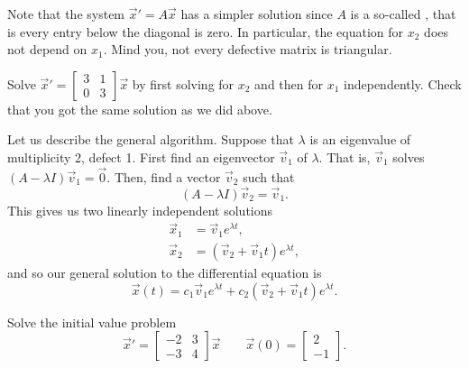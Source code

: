\documentclass{ximera}
\begin{document}
Note that the system ${\vec{x}}' = A \vec{x}$ has a simpler solution since $A$ is a so-called \emph{}, that is every entry below the diagonal is zero. In particular, the equation for $x_2$ does not depend on $x_1$.  Mind you, not every defective matrix is triangular.

\begin{exercise}
    Solve ${\vec{x}}' = \left[ \begin{smallmatrix} 3 & 1 \\ 0 & 3 \end{smallmatrix} \right] \vec{x}$ 
    by first solving for $x_2$ and then for $x_1$ independently.  Check that you got the same solution as we did above.
\end{exercise}

Let us describe the general algorithm.  Suppose that $\lambda$ is an eigenvalue of multiplicity 2, defect 1. First find an eigenvector $\vec{v}_1$ of $\lambda$. That is, $\vec{v}_1$ solves $(A-\lambda I)\vec{v}_1  = \vec{0}$. Then, find a vector $\vec{v}_2$ such that
\begin{equation*}
    (A-\lambda I)\vec{v}_2 = \vec{v}_1 .
\end{equation*}
This gives us two linearly independent solutions
\begin{align*}
    \vec{x}_1 & = \vec{v}_1 e^{\lambda t} , \\
    \vec{x}_2 & = \left( \vec{v}_2 + \vec{v}_1 t \right) e^{\lambda t},
\end{align*}
and so our general solution to the differential equation is
\begin{equation*}
    \vec{x}(t) = c_1\vec{v}_1e^{\lambda t} + c_2\left(\vec{v}_2 + \vec{v}_1 t \right) e^{\lambda t}.
\end{equation*}

\begin{example}
    Solve the initial value problem
    \begin{equation*}
        \vec{x}' = 
        \begin{bmatrix} 
            -2 & 3 \\ 
            -3 & 4 
        \end{bmatrix}
        \vec{x} \qquad \vec{x}(0) = 
        \begin{bmatrix} 
            2 \\ 
            -1 
        \end{bmatrix}.
    \end{equation*}
\end{example}
\end{document}
